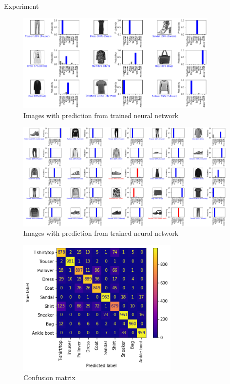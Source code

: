\documentclass[10pt]{beamer}
\theoremstyle{remark}
\theoremstyle{definition}
\begin{document}
\begin{frame}[allowframebreaks]{Experiment}
	\begin{figure}
		\centering
		\includegraphics[width=10cm]{images_with_predictions_1.png}
		\caption{Images with prediction from trained neural network}
	\end{figure}
	\begin{figure}
		\centering
		\includegraphics[width=11cm]{images_with_predictions_2.png}
		\caption{Images with prediction from trained neural network}
	\end{figure}

	\begin{figure}
		\centering
		\includegraphics[width=8cm]{confusion_matrix.png}
		\caption{Confusion matrix}
	\end{figure}


\end{frame}
\end{document}
